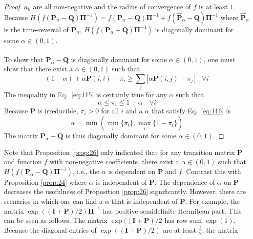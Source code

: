 \begin{proof}
  $a_k$ are all non-negative and the radius of convergence of $f$ is
  at least $1$. Because $H(f(\mathbf{P}_{\alpha} -
  \mathbf{Q})\bm{\Pi}^{-1}) = f(\mathbf{P}_{\alpha} -
  \mathbf{Q})\bm{\Pi}^{-1} + f(\hat{\mathbf{P}}_{\alpha} -
  \mathbf{Q})\bm{\Pi}^{-1}$ where $\hat{\mathbf{P}}_{\alpha}$ is the
  time-reversal of $\mathbf{P}_{\alpha}$, $H(f(\mathbf{P}_{\alpha} -
  \mathbf{Q})\bm{\Pi}^{-1})$ is diagonally dominant for some $\alpha
  \in (0,1)$. \\ \\
  \noindent
  To show that $\mathbf{P}_{\alpha} - \mathbf{Q}$ is diagonally
  dominant for some $\alpha \in (0,1)$, one must show that there
  exist a $\alpha \in (0,1)$ such that
  \begin{equation}
    \label{eq:115}
 (1 - \alpha) +
  \alpha \mathbf{P}(i,i) - \pi_i \geq \sum_{j}|\alpha \mathbf{P}(i,j)
  - \pi_j| \quad \forall i   
  \end{equation}
  The inequality in Eq.~\eqref{eq:115} is certainly true for any
  $\alpha$ such that 
  \begin{equation}
    \label{eq:116}
    \alpha \leq \pi_i \leq 1 - \alpha \quad \forall i
  \end{equation}
  Because $\mathbf{P}$ is irreducible, $\pi_i > 0$ for all $i$ and a
  $\alpha$ that satisfy Eq.~\eqref{eq:116} is 
  \begin{equation}
    \label{eq:117}
    \alpha = \min( \min_{i}\{ \pi_i \}, \max_{i} \{1 - \pi_i \})
  \end{equation}
  The matrix $\mathbf{P}_{\alpha} - \mathbf{Q}$ is thus diagonally
  dominant for some $\alpha \in (0,1)$. 
\end{proof}
Note that Proposition \ref{prop:26} only indicated that for any
transition matrix $\mathbf{P}$ and function $f$ with non-negative
coefficients, there exist a $\alpha \in (0,1)$ such that
$H(f(\mathbf{P}_{\alpha} - \mathbf{Q})\bm{\Pi}^{-1})$, i.e., the
$\alpha$ is dependent on $\mathbf{P}$ and $f$. Contrast this with
Proposition \ref{prop:24} where $\alpha$ is independent of
$\mathbf{P}$. The dependence of $\alpha$ on $\mathbf{P}$ decreases the
usefulness of Proposition \ref{prop:26} significantly. However, there
are scenarios in which one can find a $\alpha$ that is independent of
$\mathbf{P}$. For example, the matrix $\exp((\mathbf{I} +
\mathbf{P})/2)\bm{\Pi}^{-1}$ has positive semidefinite Hermitean part. This can be
seen as follows. The matrix $\exp((\mathbf{I} + \mathbf{P})/2$ has row
sum $\exp(1)$. Because the diagonal entries of $\exp((\mathbf{I} +
\mathbf{P})/2)$ are at least $\tfrac{3}{2}$, the matrix
